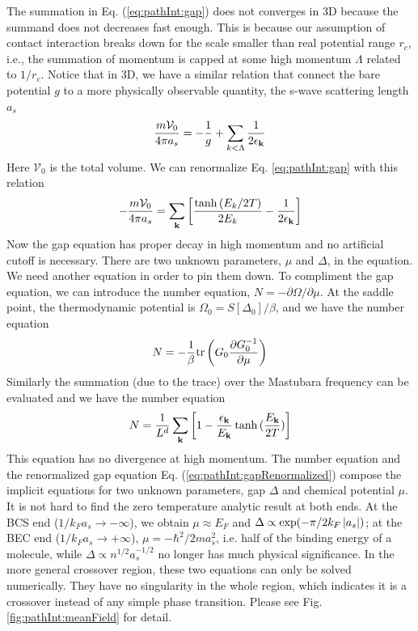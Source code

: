  The summation in Eq. (\ref{eq:pathInt:gap})  does not converges  in 3D because the summand does not decreases fast enough.  This is because our assumption of contact interaction breaks down for the scale smaller than real potential range $r_{c}$, i.e., the summation of momentum is capped at some high momentum $\Lambda$ related to $1/r_{c}$.  Notice that in 3D, we have a similar relation that connect the bare potential $g$ to a more physically observable quantity, the s-wave scattering length $a_{s}$
\begin{equation}\label{eq:pathInt:as}
\frac{m\mathcal{V}_{0}}{4\pi{}a_{s}}=-\frac{1}{g}+\sum_{k<\Lambda}\frac{1}{2\epsilon_{\mathbf{k}}}
\end{equation}
Here $\mathcal{V}_{0}$ is the total volume.  We can renormalize Eq. \ref{eq:pathInt:gap} with this relation
\begin{equation}\label{eq:pathInt:gapRenormalized}
-\frac{m\mathcal{V}_{0}}{4\pi{}a_{s}}=\sum_{\mathbf{k}}\left[\frac{\tanh{(E_k/2T)}}{2E_k}-\frac{1}{2\epsilon_{\mathbf{k}}}\right]
\end{equation}
Now the gap equation has proper decay in high momentum and no artificial cutoff is necessary.  There are two unknown parameters, $\mu$ and $\Delta$,  in the equation.  We need another equation in order to pin them down. To compliment the gap equation, we can introduce the number equation, $N=-\partial\Omega/\partial\mu$. At the saddle point, the thermodynamic potential is $\Omega_{0}=S[\Delta_{0}]/\beta$, and we have the number equation
\begin{equation*}
N=-\frac{1}{\beta}\text{tr}\left({G_{0}\frac{\partial{G_{0}^{-1}}}{\partial{\mu}}}\right)
\end{equation*}
Similarly the summation (due to the trace) over the Mastubara frequency can be evaluated and we have the number equation
\begin{equation}
N=\frac{1}{L^{d}}\sum_{\mathbf{k}}\left[1-\frac{\epsilon_{\mathbf{k}}}{E_{\mathbf{k}}}\tanh{(\frac{E_{\ensuremath{\mathbf{k}}}}{2T})}\right]
\end{equation}
This equation has no divergence at high momentum.  The number equation  and the renormalized gap equation Eq. (\ref{eq:pathInt:gapRenormalized}) compose the implicit equations for two unknown parameters, gap $\Delta$ and chemical potential $\mu$.  It is not hard to find the zero temperature analytic result at both ends.  At the BCS end ($1/k_{F}a_{s}\rightarrow-\infty$), we obtain $\mu\approx{}E_{F}$ and $\Delta\propto\exp(-\pi/2k_{F}\left\lvert{a_{s}}\right\rvert)$; at the BEC end ($1/k_{F}a_{s}\rightarrow+\infty$),  $\mu=-\hbar^{2}/2ma_{s}^{2}$, i.e. half of the binding energy of a molecule, while $\Delta\propto{}n^{1/2}a_{s}^{-1/2}$ no longer has  much physical significance.  In the more general crossover region, these two equations can only  be solved numerically.  They have no singularity in the whole region, which indicates it is a crossover instead of any simple phase transition.  Please see Fig. \ref{fig:pathInt:meanField} for detail. 
